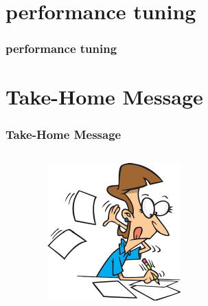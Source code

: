 \documentclass[aspectratio=169]{beamer}
\begin{document}

\section{performance tuning}
\begin{frame}
\frametitle{performance tuning}
\end{frame}



\section{Take-Home Message}
\begin{frame}
\frametitle{Take-Home Message}
\begin{columns}[c]
\begin{itemize}
\end{itemize}
\begin{center}
\begin{figure}
\includegraphics[width=.8\linewidth]{figures/home.pdf}
\end{figure}
\end{center}
\end{columns}
\end{frame}


\end{document}
